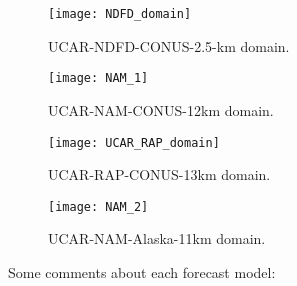 \documentclass[12pt]{article}
\begin{document}
\begin{figure}[H]
	\centering
	\label{UCAR_NDFD_Domain}
	\texttt{[image: NDFD\_domain]}
	\caption*{UCAR-NDFD-CONUS-2.5-km domain.}
\end{figure}
\begin{figure}[H]
	\centering
	\label{UCAR_NDFD_Domain}
	\texttt{[image: NAM\_1]}
	\caption*{UCAR-NAM-CONUS-12km domain.}
\end{figure}
\begin{figure}[H]
	\centering
	\label{RAP_CONUS}
	\texttt{[image: UCAR\_RAP\_domain]}
	\caption*{UCAR-RAP-CONUS-13km domain.}
\end{figure}
\begin{figure}[H]
	\centering
	\label{RAP_CONUS}
	\texttt{[image: NAM\_2]}
	\caption*{UCAR-NAM-Alaska-11km domain.}
\end{figure}
Some comments about each forecast model:
\end{document}
